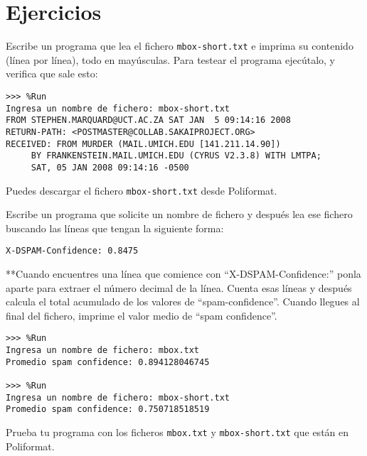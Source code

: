 
\section*{Ejercicios}\label{ejercicios}

\begin{ejercicio}
Escribe un programa que lea el fichero \texttt{mbox-short.txt} e imprima su
contenido (línea por línea), todo en mayúsculas. Para testear el programa ejecútalo, y verifica que sale esto:\\

\begin{Verbatim}[frame=single]
>>> %Run 
Ingresa un nombre de fichero: mbox-short.txt
FROM STEPHEN.MARQUARD@UCT.AC.ZA SAT JAN  5 09:14:16 2008
RETURN-PATH: <POSTMASTER@COLLAB.SAKAIPROJECT.ORG>
RECEIVED: FROM MURDER (MAIL.UMICH.EDU [141.211.14.90])
     BY FRANKENSTEIN.MAIL.UMICH.EDU (CYRUS V2.3.8) WITH LMTPA;
     SAT, 05 JAN 2008 09:14:16 -0500
\end{Verbatim}

Puedes descargar el fichero \texttt{mbox-short.txt} desde Poliformat.
\end{ejercicio}

\begin{ejercicio}
Escribe un programa que solicite un nombre de
fichero y después lea ese fichero buscando las líneas que tengan la
siguiente forma:\\

\begin{Verbatim}[frame=single]
X-DSPAM-Confidence: 0.8475
\end{Verbatim}

**Cuando encuentres una línea que comience con ``X-DSPAM-Confidence:''
ponla aparte para extraer el número decimal de la línea. Cuenta esas
líneas y después calcula el total acumulado de los valores de
``spam-confidence''. Cuando llegues al final del fichero, imprime el
valor medio de ``spam confidence''.\\

\begin{Verbatim}[frame=single]
>>> %Run
Ingresa un nombre de fichero: mbox.txt
Promedio spam confidence: 0.894128046745

>>> %Run
Ingresa un nombre de fichero: mbox-short.txt
Promedio spam confidence: 0.750718518519
\end{Verbatim}

Prueba tu programa con los ficheros \texttt{mbox.txt} y
\texttt{mbox-short.txt} que están en Poliformat.
\end{ejercicio}


